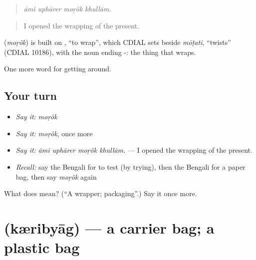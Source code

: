 \begin{quote}
   
\end{quote}

\begin{quote}
\emph{āmi uphārer moṛôk khullām.}
\end{quote}

\begin{quote}
I opened the wrapping of the present.
\end{quote}

\begin{cousinweb}
\textbf{} (\emph{moṛôk}) is built on \textbf{}, \textquotedblleft{}to wrap\textquotedblright{}, which CDIAL sets beside \emph{mōṭati}, \textquotedblleft{}twists\textquotedblright{} (CDIAL 10186), with the noun ending -: the thing that wraps.
\end{cousinweb}

\begin{grammarlens}[title={What you've built}]
One more word for getting around.
\end{grammarlens}

\subsection*{Your turn}
\begin{itemize}
\raggedright
  \item \emph{Say it:} \emph{moṛôk}
  \item \emph{Say it:} \emph{moṛôk}, once more
  \item \emph{Say it:} \emph{āmi uphārer moṛôk khullām.} — I opened the wrapping of the present.
  \item \emph{Recall:} say the Bengali for to test (by trying), then the Bengali for a paper bag, then say \emph{moṛôk} again
\end{itemize}

\begin{tcolorbox}[breakable,colback=teal!4,colframe=teal!35!black,title={Before you move on}]
What does  mean? (\textquotedblleft{}A wrapper; packaging\textquotedblright{}.) Say it once more.
\end{tcolorbox}
\section[\texorpdfstring{\bn{ক্যারিব্যাগ} (kæribyāg)}{ক্যারিব্যাগ (kæribyāg)}]{ (kæribyāg) — a carrier bag; a plastic bag}

